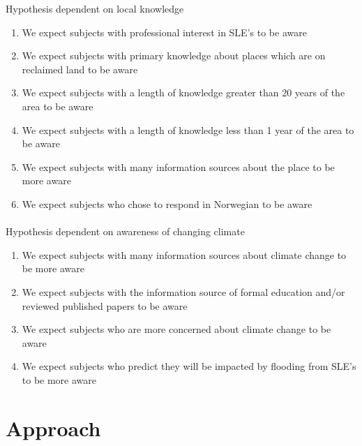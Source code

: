 Hypothesis dependent on local knowledge
\begin{enumerate}
    \item We expect subjects with professional interest in SLE's to be aware
    \item We expect subjects with primary knowledge about places which are on reclaimed land to be aware
    \item We expect subjects with a length of knowledge greater than 20 years of the area to be aware
    \item We expect subjects with a length of knowledge less than 1 year of the area to be aware
    \item We expect subjects with many information sources about the place to be more aware
    \item We expect subjects who chose to respond in Norwegian to be aware
\end{enumerate}
\paragraph{}

Hypothesis dependent on awareness of changing climate
\begin{enumerate}
    \item We expect subjects with many information sources about climate change to be more aware
    \item We expect subjects with the information source of formal education and/or reviewed published papers to be aware
    \item We expect subjects who are more concerned about climate change to be aware
    \item We expect subjects who predict they will be impacted by flooding from SLE's to be more aware
\end{enumerate}



\section{Approach}

